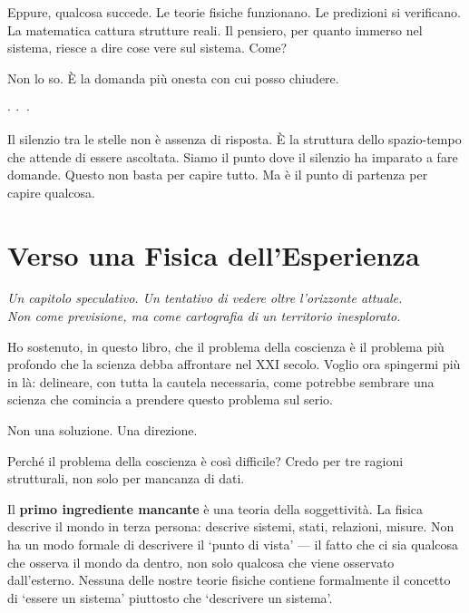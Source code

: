 \documentclass[12pt,a4paper,openany]{book}
\newcommand{\sezione}[1]{\vspace{1.2em}{\large\bfseries #1}\vspace{0.5em}\par}
\newcommand{\puntini}{\begin{center}$\cdot\ \cdot\ \cdot$\end{center}\vspace{0.3em}}
\begin{document}
Eppure, qualcosa succede. Le teorie fisiche funzionano. Le predizioni si verificano. La matematica cattura strutture reali. Il pensiero, per quanto immerso nel sistema, riesce a dire cose vere sul sistema. Come?

Non lo so. È la domanda più onesta con cui posso chiudere.

\puntini

Il silenzio tra le stelle non è assenza di risposta. È la struttura dello spazio-tempo che attende di essere ascoltata. Siamo il punto dove il silenzio ha imparato a fare domande. Questo non basta per capire tutto. Ma è il punto di partenza per capire qualcosa.

\chapter{Verso una Fisica dell'Esperienza}

\begin{center}
\itshape
Un capitolo speculativo. Un tentativo di vedere oltre l'orizzonte attuale.\\
Non come previsione, ma come cartografia di un territorio inesplorato.
\end{center}

\bigskip

Ho sostenuto, in questo libro, che il problema della coscienza è il problema più profondo che la scienza debba affrontare nel XXI secolo. Voglio ora spingermi più in là: delineare, con tutta la cautela necessaria, come potrebbe sembrare una scienza che comincia a prendere questo problema sul serio.

Non una soluzione. Una direzione.

\sezione{I tre ingredienti mancanti}

Perché il problema della coscienza è così difficile? Credo per tre ragioni strutturali, non solo per mancanza di dati.

Il \textbf{primo ingrediente mancante} è una teoria della soggettività. La fisica descrive il mondo in terza persona: descrive sistemi, stati, relazioni, misure. Non ha un modo formale di descrivere il `punto di vista' --- il fatto che ci sia qualcosa che osserva il mondo da dentro, non solo qualcosa che viene osservato dall'esterno. Nessuna delle nostre teorie fisiche contiene formalmente il concetto di `essere un sistema' piuttosto che `descrivere un sistema'.
\end{document}
